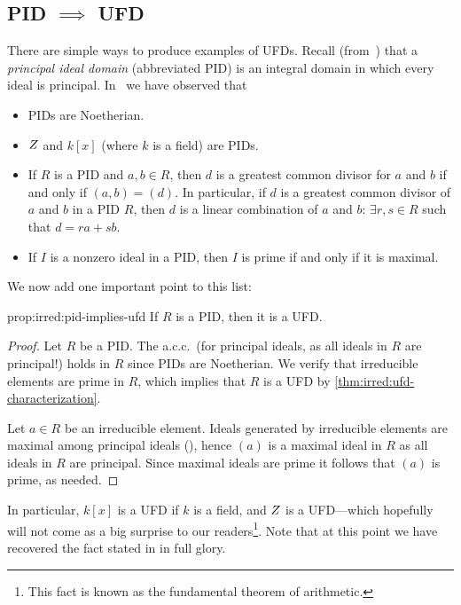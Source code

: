 \subsection{\texorpdfstring{PID $\implies$ UFD}{PID implies UFD}}
\label{subsec:irred:pid-implies-ufd}
There are simple ways to produce examples of UFDs. Recall
(from~)
that a \emph{principal ideal domain} (abbreviated PID) is an integral
domain in which every ideal is
principal. In~
we have observed that
\begin{itemize}
\item PIDs are Noetherian.
\item $Z$ and $k[x]$ (where $k$ is a field) are PIDs.
\item If $R$ is a PID and $a, b \in R$, then $d$ is a greatest common
  divisor for $a$ and $b$ if and only if $(a, b) = (d)$. In
  particular, if $d$ is a greatest common divisor of $a$ and $b$ in a
  PID $R$, then $d$ is a linear combination of $a$ and $b$:
  $\exists r, s \in R$ such that $d = ra + sb$.
\item If $I$ is a nonzero ideal in a PID, then $I$ is prime if and
  only if it is maximal.
\end{itemize}
We now add one important point to this list:

\begin{prop}{}{prop:irred:pid-implies-ufd}
  If $R$ is a PID, then it is a UFD.
\end{prop}

\begin{proof}
  Let $R$ be a PID. The a.c.c.\ (for principal ideals, as all ideals
  in $R$ are principal!) holds in $R$ since PIDs are Noetherian. We
  verify that irreducible elements are prime in $R$, which implies
  that $R$ is a UFD by \cref{thm:irred:ufd-characterization}.

  Let $a \in R$ be an irreducible element. Ideals generated by
  irreducible elements are maximal among principal ideals
  (), hence $(a)$ is a
  maximal ideal in $R$ as all ideals in $R$ are principal. Since
  maximal ideals are prime it follows that $(a)$ is prime, as needed.
\end{proof}

In particular, $k[x]$ is a UFD if $k$ is a field, and $Z$ is a
UFD---which hopefully will not come as a big surprise to our
readers\footnote{This fact is known as the fundamental theorem of
  arithmetic.}. Note that at this point we have recovered the fact
stated in  in full glory.


